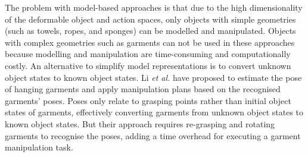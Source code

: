 \documentclass[conference]{IEEEtran}
\begin{document}
The problem with model-based approaches is that due to the high dimensionality of the deformable object and action spaces, only objects with simple geometries (such as towels, ropes, and sponges) can be modelled and manipulated. Objects with complex geometries such as garments can not be used in these approaches because modelling and manipulation are time-consuming and computationally costly. An alternative to simplify model representations is to convert unknown object states to known object states. Li \textit{et al.} \cite{8255664} \cite{7139370} have proposed to estimate the pose of hanging garments and apply manipulation plans based on the recognised garments’ poses. Poses only relate to grasping points rather than initial object states of garments, effectively converting garments from unknown object states to known object states. But their approach requires re-grasping and rotating garments to recognise the poses, adding a time overhead for executing a garment manipulation task.
\end{document}
